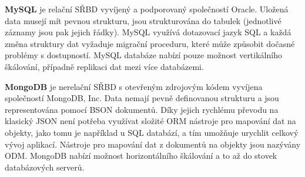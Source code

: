 \textbf{MySQL} je relační \gls{SŘBD} vyvíjený a podporovaný společností Oracle.
Uložená data musejí mít pevnou strukturu, jsou strukturována do tabulek (jednotlivé záznamy jsou pak jejich řádky).
MySQL využívá dotazovací jazyk SQL a každá změna struktury dat vyžaduje migrační proceduru, které může způsobit dočasné problémy s dostupností.
MySQL databáze nabízí pouze možnost vertikálního škálování, případně replikaci dat mezi více databázemi.~\cite{mongo:about}

\textbf{MongoDB} je nerelační \gls{SŘBD} s otevřeným zdrojovým kódem vyvíjena společností MongoDB, Inc.
Data nemají pevně definovanou strukturu a jsou representována pomocí \gls{BSON} dokumentů.
Díky jejich rychlému převodu na klasický \gls{JSON} není potřeba využívat složité \gls{ORM} nástroje pro mapování dat na objekty, jako tomu je například u \gls{SQL} databází, a tím umožňuje urychlit celkový vývoj aplikací.
Nástroje pro mapování dat z dokumentů na objekty jsou nazývány \gls{ODM}.
MongoDB nabízí možnost horizontálního škálování a to až do stovek databázových serverů.~\cite{mongo:about}

